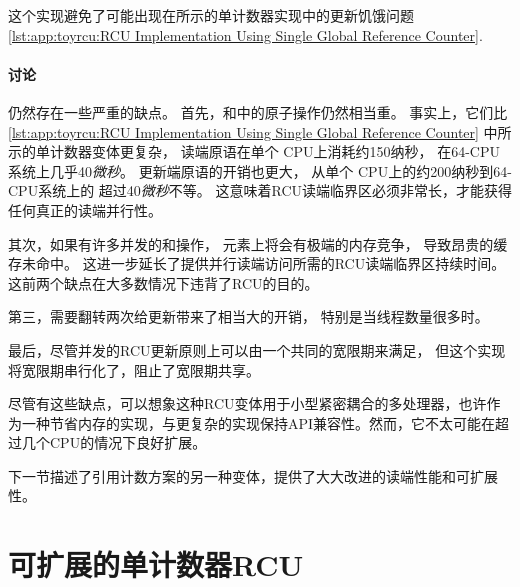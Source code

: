 这个实现避免了可能出现在所示的单计数器实现中的更新饥饿问题
\cref{lst:app:toyrcu:RCU Implementation Using Single Global Reference Counter}.

\paragraph{讨论}

仍然存在一些严重的缺点。
首先，和中的原子操作仍然相当重。
事实上，它们比
\cref{lst:app:toyrcu:RCU Implementation Using Single Global Reference Counter}
中所示的单计数器变体更复杂，
读端原语在单个 CPU上消耗约150纳秒，
在64-CPU系统上几乎40\emph{微秒}。
更新端原语的开销也更大，
从单个 CPU上的约200纳秒到64-CPU系统上的
超过40\emph{微秒}不等。
这意味着RCU读端临界区必须非常长，才能获得任何真正的读端并行性。

其次，如果有许多并发的和操作，
元素上将会有极端的内存竞争，
导致昂贵的缓存未命中。
这进一步延长了提供并行读端访问所需的RCU读端临界区持续时间。
这前两个缺点在大多数情况下违背了RCU的目的。

第三，需要翻转两次给更新带来了相当大的开销，
特别是当线程数量很多时。

最后，尽管并发的RCU更新原则上可以由一个共同的宽限期来满足，
但这个实现将宽限期串行化了，阻止了宽限期共享。

\QuickQuizEnd

尽管有这些缺点，可以想象这种RCU变体用于小型紧密耦合的多处理器，也许作为一种节省内存的实现，与更复杂的实现保持API兼容性。然而，它不太可能在超过几个CPU的情况下良好扩展。

下一节描述了引用计数方案的另一种变体，提供了大大改进的读端性能和可扩展性。

\section{可扩展的单计数器RCU}
\label{sec:app:toyrcu:Scalable Single-Counter RCU}

